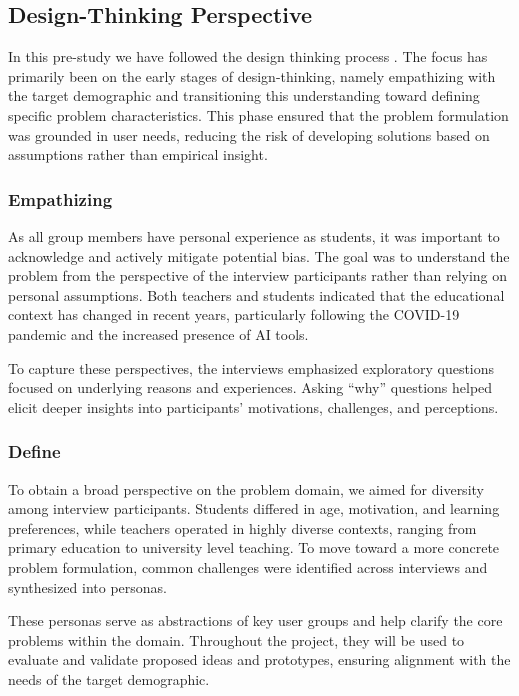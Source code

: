 \subsection{Design-Thinking Perspective}
In this pre-study we have followed the design thinking process \cite{DesignThinking}.
The focus has primarily been on the early stages of design-thinking, namely empathizing
with the target demographic and transitioning this understanding toward defining specific problem characteristics.
This phase ensured that the problem formulation was grounded in user needs,
reducing the risk of developing solutions based on assumptions rather than empirical insight.

\subsubsection{Empathizing}
As all group members have personal experience as students, it was important to acknowledge and actively mitigate potential bias. 
The goal was to understand the problem from the perspective of the interview participants rather than relying on personal assumptions. 
Both teachers and students indicated that the educational context has changed in recent years, particularly following the 
COVID-19 pandemic and the increased presence of AI tools.

To capture these perspectives, the interviews emphasized exploratory questions focused on underlying reasons and experiences.
Asking “why” questions helped elicit deeper insights into participants’ motivations, challenges, and perceptions.

\subsubsection{Define}

To obtain a broad perspective on the problem domain, we aimed for diversity among interview participants.
Students differed in age, motivation, and learning preferences, 
while teachers operated in highly diverse contexts, ranging from primary education to university level teaching. 
To move toward a more concrete problem formulation, common challenges were identified across interviews and synthesized into personas.

These personas serve as abstractions of key user groups and help clarify the core problems within the domain. 
Throughout the project, they will be used to evaluate and validate proposed ideas and prototypes, ensuring alignment with the needs of the target demographic.

